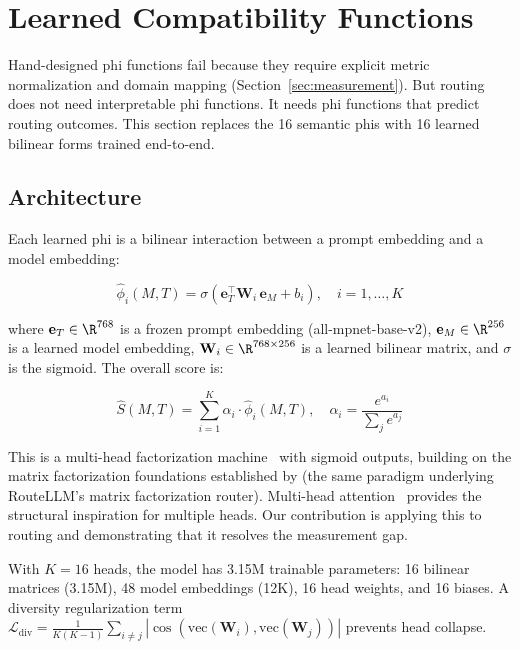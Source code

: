 \section{Learned Compatibility Functions}
\label{sec:learned_phi}

Hand-designed phi functions fail because they require explicit metric normalization and domain mapping (Section~\ref{sec:measurement}). But routing does not need interpretable phi functions. It needs phi functions that predict routing outcomes. This section replaces the 16 semantic phis with 16 learned bilinear forms trained end-to-end.

\subsection{Architecture}

Each learned phi is a bilinear interaction between a prompt embedding and a model embedding:

\begin{equation}
\label{eq:bilinear_phi}
\hat{\phi}_i(M, T) = \sigma\!\left(\mathbf{e}_T^\top \mathbf{W}_i \, \mathbf{e}_M + b_i\right), \quad i = 1, \ldots, K
\end{equation}

where $\mathbf{e}_T \in \R^{768}$ is a frozen prompt embedding (all-mpnet-base-v2), $\mathbf{e}_M \in \R^{256}$ is a learned model embedding, $\mathbf{W}_i \in \R^{768 \times 256}$ is a learned bilinear matrix, and $\sigma$ is the sigmoid. The overall score is:

\begin{equation}
\label{eq:bilinear_score}
\hat{S}(M, T) = \sum_{i=1}^{K} \alpha_i \cdot \hat{\phi}_i(M, T), \quad \alpha_i = \frac{e^{a_i}}{\sum_j e^{a_j}}
\end{equation}

This is a multi-head factorization machine~\citep{rendle2010factorization} with sigmoid outputs, building on the matrix factorization foundations established by \citet{koren2009matrix} (the same paradigm underlying RouteLLM's matrix factorization router). Multi-head attention~\citep{vaswani2017attention} provides the structural inspiration for multiple heads. Our contribution is applying this to routing and demonstrating that it resolves the measurement gap.

With $K=16$ heads, the model has 3.15M trainable parameters: 16 bilinear matrices (3.15M), 48 model embeddings (12K), 16 head weights, and 16 biases. A diversity regularization term $\mathcal{L}_{\text{div}} = \frac{1}{K(K-1)} \sum_{i \neq j} |\cos(\text{vec}(\mathbf{W}_i), \text{vec}(\mathbf{W}_j))|$ prevents head collapse.

